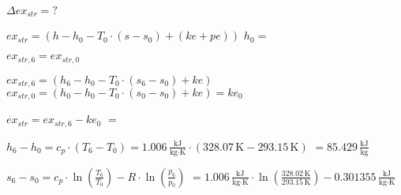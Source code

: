 \( \Delta ex_{str} = ? \)  

\( ex_{str} = (h - h_0 - T_0 \cdot (s - s_0) + (ke + pe)) \)  
\( h_0 = \)  

\( ex_{str,6} = ex_{str,0} \)  

\( ex_{str,6} = (h_6 - h_0 - T_0 \cdot (s_6 - s_0) + ke) \)  
\( ex_{str,0} = (h_0 - h_0 - T_0 \cdot (s_0 - s_0) + ke) = ke_0 \)  

\( \dot{ex}_{str} = ex_{str,6} - ke_0 \)  
\( = \)  

\( h_6 - h_0 = c_p \cdot (T_6 - T_0) = 1.006 \, \frac{\text{kJ}}{\text{kg·K}} \cdot (328.07 \, \text{K} - 293.15 \, \text{K}) \)  
\( = 85.429 \, \frac{\text{kJ}}{\text{kg}} \)  

\( s_6 - s_0 = c_p \cdot \ln \left( \frac{T_6}{T_0} \right) - R \cdot \ln \left( \frac{p_6}{p_0} \right) \)  
\( = 1.006 \, \frac{\text{kJ}}{\text{kg·K}} \cdot \ln \left( \frac{328.02 \, \text{K}}{293.15 \, \text{K}} \right) - 0.301355 \, \frac{\text{kJ}}{\text{kg·K}} \)